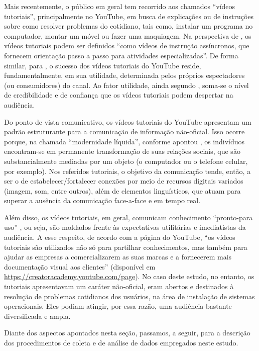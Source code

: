 \documentclass[portuguese]{textolivre}
\begin{document}
Mais recentemente, o público em geral tem recorrido aos chamados “vídeos tutoriais”, principalmente no YouTube, em busca de explicações ou de instruções sobre como resolver problemas do cotidiano, tais como, instalar um programa no computador, montar um móvel ou fazer uma maquiagem. Na perspectiva de \textcite[p. 148]{tarquini2019}, os vídeos tutoriais podem ser definidos “como vídeos de instrução assíncronos, que fornecem orientação passo a passo para atividades especializadas”. De forma similar, para \textcite{mogos2015}, o sucesso dos vídeos tutoriais do YouTube reside, fundamentalmente, em sua utilidade, determinada pelos próprios espectadores (ou consumidores) do canal. Ao fator utilidade, ainda segundo \textcite{mogos2015}, soma-se o nível de credibilidade e de confiança que os vídeos tutoriais podem despertar na audiência.

Do ponto de vista comunicativo, os vídeos tutoriais do YouTube apresentam um padrão estruturante para a comunicação de informação não-oficial. Isso ocorre porque, na chamada “modernidade líquida”, conforme apontou \textcite[p. 139]{knorr1997}, os indivíduos encontram-se em permanente transformação de suas relações sociais, que são substancialmente mediadas por um objeto (o computador ou o telefone celular, por exemplo). Nos referidos tutoriais, o objetivo da comunicação tende, então, a ser o de estabelecer/fortalecer conexões por meio de recursos digitais variados (imagem, som, entre outros), além de elementos linguísticos, que atuam para superar a ausência da comunicação face-a-face e em tempo real.

Além disso, os vídeos tutoriais, em geral, comunicam conhecimento “pronto-para uso” \cite{xie2021}, ou seja, são moldados frente às expectativas utilitárias e imediatistas da audiência. A esse respeito, de acordo com a página do YouTube, “os vídeos tutoriais são utilizados não só para partilhar conhecimentos, mas também para ajudar as empresas a comercializarem as suas marcas e a fornecerem mais documentação visual aos clientes” (disponível em \href{https://creatoracademy.youtube.com/page}{ }\url{https://creatoracademy.youtube.com/page}). No caso deste estudo, no entanto, os tutoriais apresentavam um caráter não-oficial, eram abertos e destinados à resolução de problemas cotidianos dos usuários, na área de instalação de sistemas operacionais. Eles podiam atingir, por essa razão, uma audiência bastante diversificada e ampla. 

Diante dos aspectos apontados nesta seção, passamos, a seguir, para a descrição dos procedimentos de coleta e de análise de dados empregados neste estudo.
\end{document}
